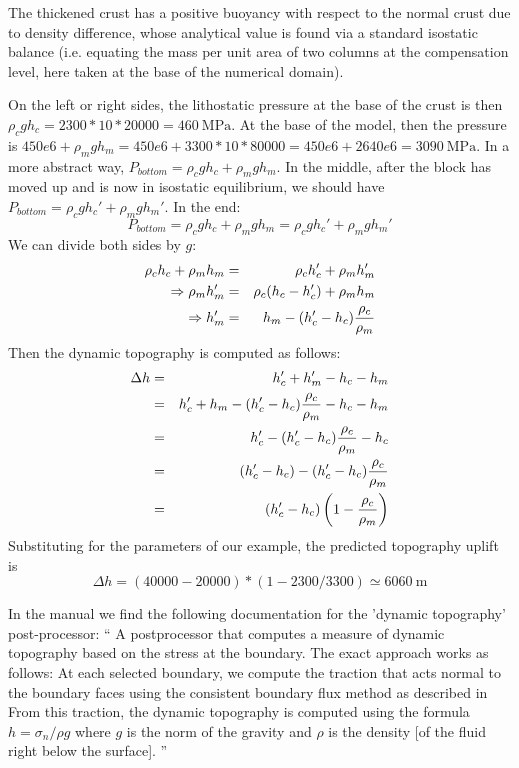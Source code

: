 The thickened crust has a positive buoyancy with respect to the normal crust due
to density difference, whose analytical value is found via a standard isostatic balance (i.e.
equating the mass per unit area of two columns at the compensation level, here taken at
the base of the numerical domain).




On the left or right sides, the lithostatic pressure at the base of the crust is then 
$\rho_{c} g h_{c}=2300*10*20000=460~\si{\mega\pascal}$.
At the base of the model, then the pressure is $450e6+\rho_{m} g h_{m}
=450e6+3300*10*80000=450e6+2640e6=3090~\si{\mega\pascal}$.
In a more abstract way, $P_{bottom}=\rho_c g h_c + \rho_m g h_m$.
In the middle, after the block has moved up and is now in isostatic equilibrium, 
we should have $P_{bottom}=\rho_c g h_c' + \rho_m g h_m'$.
In the end:
\[
P_{bottom}=\rho_c g h_c + \rho_m g h_m = \rho_c g h_c' + \rho_m g h_m'
\]
We can divide both sides by $g$:
\begin{eqnarray}
\rho_c  h_c + \rho_m  h_m &=& \rho_c  h_c' + \rho_m  h_m' \nonumber\\
\Rightarrow \rho_m h_m'&=& \rho_c(h_c-h_c') + \rho_m h_m  \nonumber\\
\Rightarrow h_m' &=& h_m-(h_c'-h_c)\frac{\rho_c}{\rho_m} \nonumber
\end{eqnarray}
Then the dynamic topography is computed as follows:
\begin{eqnarray}
\Delta h 
&=& h_c' + h_m' - h_c - h_m \nonumber\\
&=& h_c' + h_m -(h_c'-h_c)\frac{\rho_c}{\rho_m} -h_c - h_m \nonumber\\
&=& h_c'  -(h_c'-h_c)\frac{\rho_c}{\rho_m} -h_c  \nonumber\\
&=& (h_c'-h_c)  -(h_c'-h_c)\frac{\rho_c}{\rho_m}   \nonumber\\
&=& (h_c'-h_c) \left(1 -\frac{\rho_c}{\rho_m} \right) 
\end{eqnarray}
Substituting for the parameters of our example, the predicted topography uplift is 
\[
\Delta h = (40000-20000)*(1-2300/3300) \simeq 6060~\si{\meter}
\]


In the \aspect manual we find the following documentation for the 'dynamic topography' post-processor:
``
A postprocessor that computes a measure of dynamic topography based on the stress at the boundary. 
The exact approach works as follows: At each selected boundary, we compute the traction that acts normal to 
the boundary faces using the consistent boundary flux method as described in \textcite{grls87}
From this traction, the dynamic topography is computed using the formula $h=\sigma_n / \rho g$ where $g$
is the norm of the gravity and $\rho$
is the density [of the fluid right below the surface]. 
''

